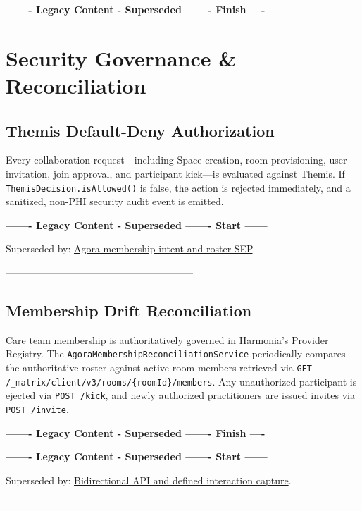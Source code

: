 \par\noindent\textbf{------- Legacy Content - Superseded ------- Finish ----}

\section{Security Governance \& Reconciliation}

\subsection{Themis Default-Deny Authorization}
Every collaboration request---including Space creation, room provisioning, user invitation, join approval, and participant kick---is evaluated against Themis. If \nolinkurl{ThemisDecision.isAllowed()} is false, the action is rejected immediately, and a sanitized, non-PHI security audit event is emitted.


\par\noindent\textbf{------- Legacy Content - Superseded ------- Start ------}
\par\noindent Superseded by: \href{../../markdown/05-information-systems-architecture/agora-omilia-collaboration.md\#membership-and-roster}{Agora membership intent and roster SEP}.
\par\noindent ---------------------------------------------------------

\subsection{Membership Drift Reconciliation}
Care team membership is authoritatively governed in Harmonia's Provider Registry. The \nolinkurl{AgoraMembershipReconciliationService} periodically compares the authoritative roster against active room members retrieved via \nolinkurl{GET /_matrix/client/v3/rooms/{roomId}/members}. Any unauthorized participant is ejected via \nolinkurl{POST /kick}, and newly authorized practitioners are issued invites via \nolinkurl{POST /invite}.


\par\noindent\textbf{------- Legacy Content - Superseded ------- Finish ----}


\par\noindent\textbf{------- Legacy Content - Superseded ------- Start ------}
\par\noindent Superseded by: \href{../../markdown/05-information-systems-architecture/agora-omilia-collaboration.md\#application-services-api}{Bidirectional API and defined interaction capture}.
\par\noindent ---------------------------------------------------------

